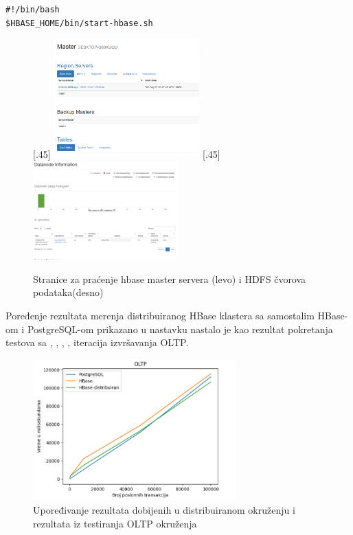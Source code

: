 \documentclass[12pt,oneside]{memoir}
\begin{document}
\begin{lstlisting}[title={start-hbase.sh},captionpos=t]
#!/bin/bash
$HBASE_HOME/bin/start-hbase.sh
\end{lstlisting}

\begin{figure}[ht]
  \subcaptionbox*{}[.45\linewidth]{%
      \includegraphics[width=0.5\textwidth]{hbase-master.png}
  }%
  \hfill
  \subcaptionbox*{}[.45\linewidth]{%
      \includegraphics[width=0.5\textwidth]{datanode.png}
  }
  \caption{Stranice za praćenje hbase master servera (levo) i HDFS čvorova podataka(desno)}
\end{figure}

Poređenje rezultata merenja distribuiranog HBase klastera sa samostalim HBase-om i PostgreSQL-om  prikazano u nastavku nastalo je kao rezultat pokretanja testova sa , , , ,  iteracija izvršavanja OLTP.

\begin{figure}[!ht]
  \centering
  \includegraphics[width=0.7\textwidth]{dist-results.png}
  \caption{Upoređivanje rezultata dobijenih u distribuiranom okruženju i rezultata iz testiranja OLTP okruženja}
  \label{fig:grafikon}
\end{figure}
\end{document}
